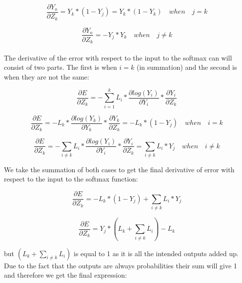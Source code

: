 \documentclass[a4paper, 12pt]{article}
\begin{document}
    \begin{equation}
        \frac{\partial Y_o}{\partial Z_k} = Y_k * (1-Y_j) = Y_k * (1-Y_k) \quad {when \quad j = k}
    \end{equation}

    \begin{equation}
        \frac{\partial Y_o}{\partial Z_k} = - Y_j * Y_k \quad {when \quad j \neq k}
    \end{equation}\\

    The derivative of the error with respect to the input to the softmax can will consist of two parts. The first is when $i = k$ (in summation) and the second is when they are not the same:

    \begin{equation}
        \frac{\partial E}{\partial Z_k} = - \sum_{i=1}^{k} L_i * \frac{\partial log(Y_i)}{\partial Y_i} * \frac{\partial Y_i}{\partial Z_k} 
    \end{equation}

    \begin{equation}
        \frac{\partial E}{\partial Z_k} = -L_k * \frac{\partial log(Y_k)}{\partial Y_k} * \frac{\partial Y_k}{\partial Z_k} = -L_k * (1-Y_j) \quad {when \quad i = k}
    \end{equation}

    \begin{equation}
        \frac{\partial E}{\partial Z_k} = - \sum_{i \neq k} L_i * \frac{\partial log(Y_i)}{\partial Y_i} * \frac{\partial Y_i}{\partial Z_k} =  \sum_{i \neq k} L_i * Y_j \quad {when \quad i \neq k}
    \end{equation}

    We take the summation of both cases to get the final derivative of error with respect to the input to the softmax function:

    \begin{equation}
        \frac{\partial E}{\partial Z_k} = -L_k * (1-Y_j) + \sum_{i \neq k} L_i * Y_j
    \end{equation}
    
    \begin{equation}
        \frac{\partial E}{\partial Z_k} = Y_j * (L_k + \sum_{i \neq k} L_i) - L_k
    \end{equation}
    
    but $(L_k + \sum_{i \neq k} L_i)$ is equal to 1 as it is all the intended outputs added up. Due to the fact that the outputs are always probabilities their sum will give 1 and therefore we get the final expression:
\end{document}
